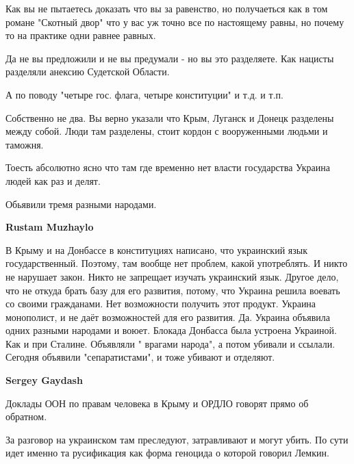 \begin{itemize}
\begin{itemize}
Как вы не пытаетесь доказать что вы за равенство, но получаеться как в том
романе "Скотный двор" что у вас уж точно все по настоящему равны, но почему то
на практике одни равнее равных.

Да не вы предложили и не вы предумали - но вы это разделяете. Как нацисты
разделяли анексию Судетской Области.

А по поводу "четыре гос. флага, четыре конституции" и т.д. и т.п.

Собственно не два. Вы верно указали что Крым, Луганск и Донецк разделены между
собой. Люди там разделены, стоит кордон с вооруженными людьми и таможня.

Тоесть абсолютно ясно что там где временно нет власти государства Украина людей
как раз и делят.

Обьявили тремя разными народами.

 
\textbf{Rustam Muzhaylo} 

В Крыму и на Донбассе в конституциях написано, что украинский язык
государственный. Поэтому, там вообще нет проблем, какой употреблять. И никто не
нарушает закон. Никто не запрещает изучать украинский язык. Другое дело, что не
откуда брать базу для его развития, потому, что Украина решила воевать со
своими гражданами. Нет возможности получить этот продукт. Украина монополист, и
не даёт возможностей для его развития. Да. Украина объявила одних разными
народами и воюет. Блокада Донбасса была устроена Украиной. Как и при Сталине.
Объявляли " врагами народа", а потом убивали и ссылали. Сегодня объявили
"сепаратистами", и тоже убивают и отделяют.

 
\textbf{Sergey Gaydash}

Доклады ООН по правам человека в Крыму и ОРДЛО говорят прямо об обратном.

За разговор на украинском там преследуют, затравливают и могут убить. По сути
идет именно та русификация как форма геноцида о которой говорил Лемкин.


\end{itemize}
\end{itemize}
